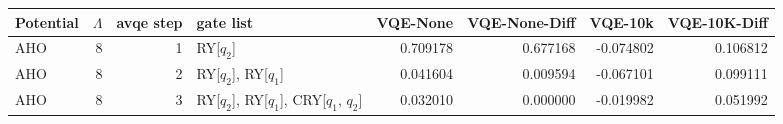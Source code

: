 \begin{tabular}{lrrlrrrr}
\toprule
Potential & $\Lambda$ & avqe step & gate list & VQE-None & VQE-None-Diff & VQE-10k & VQE-10K-Diff \\
\midrule
AHO & 8 & 1 & RY[$q_2$] & 0.709178 & 0.677168 & -0.074802 & 0.106812 \\
AHO & 8 & 2 & RY[$q_2$], RY[$q_1$] & 0.041604 & 0.009594 & -0.067101 & 0.099111 \\
AHO & 8 & 3 & RY[$q_2$], RY[$q_1$], CRY[$q_1$, $q_2$] & 0.032010 & 0.000000 & -0.019982 & 0.051992 \\
\bottomrule
\end{tabular}
